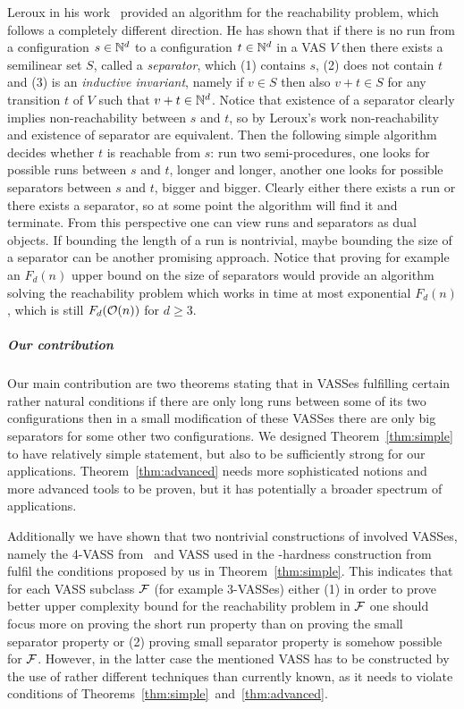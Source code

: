 Leroux in his work~\cite{DBLP:conf/lics/Leroux09} provided an algorithm for the reachability problem,
which follows a completely different direction. He has shown that if there is no run from a configuration $s \in \mathbb{N}^d$
to a configuration $t \in \mathbb{N}^d$ in a VAS $V$ then there exists a semilinear set $S$, called a \emph{separator}, which
(1) contains $s$, (2) does not contain $t$ and (3) is an \emph{inductive invariant}, namely if $v \in S$ then also $v+t \in S$
for any transition $t$ of $V$ such that $v+t \in \mathbb{N}^d$. Notice that existence of a separator clearly implies non-reachability between
$s$ and $t$, so by Leroux's work non-reachability and existence of separator are equivalent. Then the following simple algorithm
decides whether $t$ is reachable from $s$: run two semi-procedures, one looks for possible runs between $s$ and $t$, longer and longer,
another one looks for possible separators between $s$ and $t$, bigger and bigger. Clearly either there exists a run or there exists
a separator, so at some point the algorithm will find it and terminate. From this perspective one can view runs and separators as dual
objects. If bounding the length of a run is nontrivial, maybe bounding the size of a separator can be another promising approach.
Notice that proving for example an $F_d(n)$ upper bound on the size of separators would provide an algorithm solving
the reachability problem which works in time at most exponential $F_d(n)$, which is still $F_d(\mathcal{O}(n))$ for $d \geq 3$.

\subparagraph*{Our contribution}
Our main contribution are two theorems stating that in VASSes fulfilling certain rather natural conditions if there are only long runs between
some of its two configurations then in a small modification of these VASSes there are only big separators for some other two configurations.
We designed Theorem~\ref{thm:simple} to have relatively simple statement, but also to be sufficiently strong for our applications.
Theorem~\ref{thm:advanced} needs more sophisticated notions and more advanced tools to be proven, but it has potentially a broader
spectrum of applications. 

Additionally we have shown that two nontrivial constructions of involved VASSes,
namely the 4-VASS from~\cite{DBLP:conf/concur/Czerwinski0LLM20} and VASS used in the \tower-hardness
construction from~\cite{DBLP:conf/stoc/CzerwinskiLLLM19} fulfil the conditions proposed by us in Theorem~\ref{thm:simple}.
This indicates that for each VASS subclass $\mathcal{F}$ (for example $3$-VASSes) either (1) in order to prove better upper complexity bound
for the reachability problem in $\mathcal{F}$ one should focus more on proving the short run property than on proving the small separator property or
(2) proving small separator property is somehow possible for $\mathcal{F}$.
However, in the latter case the mentioned VASS has to be constructed by the use of rather different techniques than currently known, as it needs to violate conditions of Theorems~\ref{thm:simple}~and~\ref{thm:advanced}.

